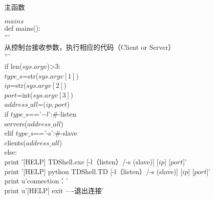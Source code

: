 \begin{breakablealgorithm}
	\caption{主函数}
	\begin{algorithmic}[1]
	\Require $mains$\\
	
def mains():\\
		
	'''\\
	
	从控制台接收参数，执行相应的代码（Client or Server）\\
	
	'''\\
	
	\qquad if \quad len($sys.argv$)>3:\\
	
		\qquad \qquad $type\_s$=str($sys.argv[1]$)\\
		
		\qquad \qquad $ip$=str($sys.argv[2]$)\\
		
		\qquad \qquad $port$=int($sys.argv[3]$)\\
		
		\qquad \qquad $address\_all$=($ip,port$)\\
		
		\qquad \qquad if \quad $type\_s$=='$-l$':\qquad \#-listen\\
		
			\qquad \qquad\qquad servers($address\_all$)\\
		
		\qquad \qquad elif \quad $type\_s$=='-s':\qquad \#-slave\\
		
			\qquad \qquad\quad\quad clients($address\_all$)\\
		
		\qquad \qquad else:\\
		
			\qquad \qquad \qquad print \quad '[HELP]  TDShell.exe [-l（listen）/-s (slave)] [$ip$] [$port$]'\\
			
			\qquad \qquad \qquad print \quad '[HELP]  python TDShell.TD [-l（listen）/-s (slave)] [$ip$] [$port$]'\\
			
			\qquad \qquad \qquad print \quad u'connection：'\\
			
			\qquad \qquad \qquad print \quad u'[HELP]  \quad exit   \quad  ----退出连接'\\
		

\end{algorithmic}
\end{breakablealgorithm}
